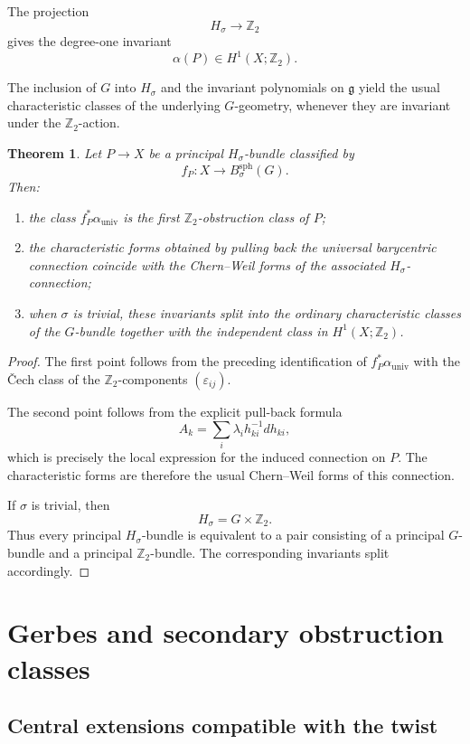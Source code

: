 \documentclass[11pt]{amsart}
\newtheorem{theorem}[definition]{Theorem}
\begin{document}
The projection
\[
H_\sigma\to \mathbb Z_2
\]
gives the degree-one invariant
\[
\alpha(P)\in H^1(X;\mathbb Z_2).
\]

The inclusion of \(G\) into \(H_\sigma\) and the invariant polynomials on \(\mathfrak g\) yield the usual characteristic classes of the underlying \(G\)-geometry, whenever they are invariant under the \(\mathbb Z_2\)-action.

\begin{theorem}
Let \(P\to X\) be a principal \(H_\sigma\)-bundle classified by
\[
f_P:X\to B^{\mathrm{sph}}_\sigma(G).
\]
Then:
\begin{enumerate}
\item the class \(f_P^*\alpha_{\mathrm{univ}}\) is the first \(\mathbb Z_2\)-obstruction class of \(P\);
\item the characteristic forms obtained by pulling back the universal barycentric connection coincide with the Chern--Weil forms of the associated \(H_\sigma\)-connection;
\item when \(\sigma\) is trivial, these invariants split into the ordinary characteristic classes of the \(G\)-bundle together with the independent class in \(H^1(X;\mathbb Z_2)\).
\end{enumerate}
\end{theorem}

\begin{proof}
The first point follows from the preceding identification of \(f_P^*\alpha_{\mathrm{univ}}\) with the Čech class of the \(\mathbb Z_2\)-components \((\varepsilon_{ij})\).

The second point follows from the explicit pull-back formula
\[
A_k=\sum_i\lambda_i h_{ki}^{-1}dh_{ki},
\]
which is precisely the local expression for the induced connection on \(P\). The characteristic forms are therefore the usual Chern--Weil forms of this connection.

If \(\sigma\) is trivial, then
\[
H_\sigma=G\times \mathbb Z_2.
\]
Thus every principal \(H_\sigma\)-bundle is equivalent to a pair consisting of a principal \(G\)-bundle and a principal \(\mathbb Z_2\)-bundle. The corresponding invariants split accordingly.
\end{proof}

\section{Gerbes and secondary obstruction classes}
\label{sec:gerbes}

\subsection{Central extensions compatible with the twist}
\end{document}
